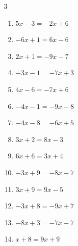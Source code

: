 \begin{multicols}{3}
\begin{enumerate}
  \item $5x-3=-2x+6$


  \item $-6x+1=6x-6$


  \item $2x+1=-9x-7$


  \item $-3x-1=-7x+3$

        \phantom{$\displaystyle x=1$}

  \item $4x-6=-7x+6$


  \item $-4x-1=-9x-8$


  \item $-4x-8=-6x+5$


\columnbreak %

  \item $3x+2=8x-3$

        \phantom{$\displaystyle x=1$}

  \item $6x+6=3x+4$


  \item $-3x+9=-8x-7$


  \item $3x+9=9x-5$


  \item $-3x+8=-9x+7$


  \item $-8x+3=-7x-7$

        \phantom{$\displaystyle x=10$}

  \item $x+8=9x+9$


\end{enumerate}
\end{multicols}
